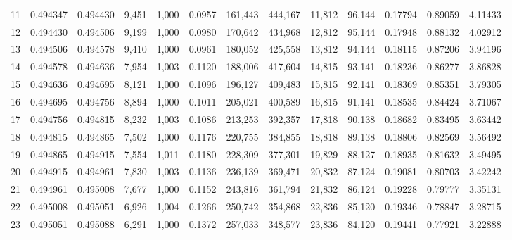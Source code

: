 \begin{tabular}{rrrrrrrrrrrrr}
11  &  0.494347 &  0.494430 &   9,451 &  1,000 &                                     0.0957 &  161,443 &  444,167 &   11,812 &   96,144 &  0.17794 &  0.89059 &  4.11433 \\
12  &  0.494430 &  0.494506 &   9,199 &  1,000 &                                     0.0980 &  170,642 &  434,968 &   12,812 &   95,144 &  0.17948 &  0.88132 &  4.02912 \\
13  &  0.494506 &  0.494578 &   9,410 &  1,000 &                                     0.0961 &  180,052 &  425,558 &   13,812 &   94,144 &  0.18115 &  0.87206 &  3.94196 \\
14  &  0.494578 &  0.494636 &   7,954 &  1,003 &                                     0.1120 &  188,006 &  417,604 &   14,815 &   93,141 &  0.18236 &  0.86277 &  3.86828 \\
15  &  0.494636 &  0.494695 &   8,121 &  1,000 &                                     0.1096 &  196,127 &  409,483 &   15,815 &   92,141 &  0.18369 &  0.85351 &  3.79305 \\
16  &  0.494695 &  0.494756 &   8,894 &  1,000 &                                     0.1011 &  205,021 &  400,589 &   16,815 &   91,141 &  0.18535 &  0.84424 &  3.71067 \\
17  &  0.494756 &  0.494815 &   8,232 &  1,003 &                                     0.1086 &  213,253 &  392,357 &   17,818 &   90,138 &  0.18682 &  0.83495 &  3.63442 \\
18  &  0.494815 &  0.494865 &   7,502 &  1,000 &                                     0.1176 &  220,755 &  384,855 &   18,818 &   89,138 &  0.18806 &  0.82569 &  3.56492 \\
19  &  0.494865 &  0.494915 &   7,554 &  1,011 &                                     0.1180 &  228,309 &  377,301 &   19,829 &   88,127 &  0.18935 &  0.81632 &  3.49495 \\
20  &  0.494915 &  0.494961 &   7,830 &  1,003 &                                     0.1136 &  236,139 &  369,471 &   20,832 &   87,124 &  0.19081 &  0.80703 &  3.42242 \\
21  &  0.494961 &  0.495008 &   7,677 &  1,000 &                                     0.1152 &  243,816 &  361,794 &   21,832 &   86,124 &  0.19228 &  0.79777 &  3.35131 \\
22  &  0.495008 &  0.495051 &   6,926 &  1,004 &                                     0.1266 &  250,742 &  354,868 &   22,836 &   85,120 &  0.19346 &  0.78847 &  3.28715 \\
23  &  0.495051 &  0.495088 &   6,291 &  1,000 &                                     0.1372 &  257,033 &  348,577 &   23,836 &   84,120 &  0.19441 &  0.77921 &  3.22888 \\

\end{tabular}
